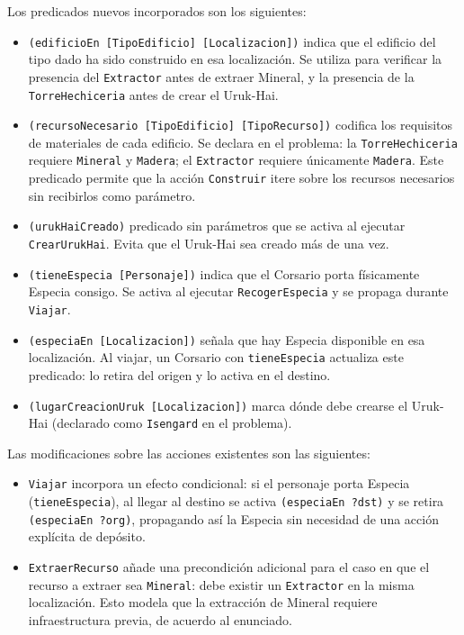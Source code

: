 \documentclass[10pt]{article}
\begin{document}
Los predicados nuevos incorporados son los siguientes:
\begin{itemize}[label=-]
    \item \texttt{(edificioEn [TipoEdificio] [Localizacion])} indica que el edificio del tipo dado ha sido construido en esa localización. Se utiliza para verificar la presencia del \texttt{Extractor} antes de extraer Mineral, y la presencia de la \texttt{TorreHechiceria} antes de crear el Uruk-Hai.
    \item \texttt{(recursoNecesario [TipoEdificio] [TipoRecurso])} codifica los requisitos de materiales de cada edificio. Se declara en el problema: la \texttt{TorreHechiceria} requiere \texttt{Mineral} y \texttt{Madera}; el \texttt{Extractor} requiere únicamente \texttt{Madera}. Este predicado permite que la acción \texttt{Construir} itere sobre los recursos necesarios sin recibirlos como parámetro.
    \item \texttt{(urukHaiCreado)} predicado sin parámetros que se activa al ejecutar \texttt{CrearUrukHai}. Evita que el Uruk-Hai sea creado más de una vez.
    \item \texttt{(tieneEspecia [Personaje])} indica que el Corsario porta físicamente Especia consigo. Se activa al ejecutar \texttt{RecogerEspecia} y se propaga durante \texttt{Viajar}.
    \item \texttt{(especiaEn [Localizacion])} señala que hay Especia disponible en esa localización. Al viajar, un Corsario con \texttt{tieneEspecia} actualiza este predicado: lo retira del origen y lo activa en el destino.
    \item \texttt{(lugarCreacionUruk [Localizacion])} marca dónde debe crearse el Uruk-Hai (declarado como \texttt{Isengard} en el problema).
\end{itemize}
 
Las modificaciones sobre las acciones existentes son las siguientes:
\begin{itemize}[label=-]
    \item \texttt{Viajar} incorpora un efecto condicional: si el personaje porta Especia (\texttt{tieneEspecia}), al llegar al destino se activa \texttt{(especiaEn ?dst)} y se retira \texttt{(especiaEn ?org)}, propagando así la Especia sin necesidad de una acción explícita de depósito.
    \item \texttt{ExtraerRecurso} añade una precondición adicional para el caso en que el recurso a extraer sea \texttt{Mineral}: debe existir un \texttt{Extractor} en la misma localización. Esto modela que la extracción de Mineral requiere infraestructura previa, de acuerdo al enunciado.
\end{itemize}
 
\end{document}
